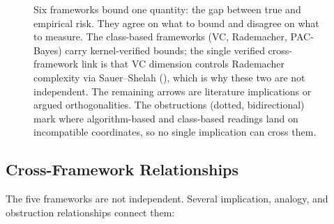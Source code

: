\begin{figure}[ht]
\caption[Six generalization frameworks: one risk gap, many certificates.]{Six frameworks bound one quantity: the gap between true and empirical risk. They agree on what to bound and disagree on what to measure. The class-based frameworks (VC, Rademacher, PAC-Bayes) carry kernel-verified bounds; the single verified cross-framework link is that VC dimension controls Rademacher complexity via Sauer--Shelah (), which is why these two are not independent. The remaining arrows are literature implications or argued orthogonalities. The obstructions (dotted, bidirectional) mark where algorithm-based and class-based readings land on incompatible coordinates, so no single implication can cross them.}
\label{fig:five-frameworks}
\end{figure}


\subsection{Cross-Framework Relationships}

The five frameworks are not independent.  Several implication, analogy,
and obstruction relationships connect them:

